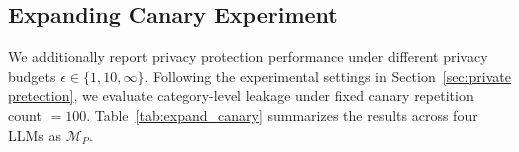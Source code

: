 \documentclass{article}
\theoremstyle{plain}
\theoremstyle{definition}
\theoremstyle{remark}
\def \toolname{PrivCode++}
\begin{document}
{\begin{table}[t]
\centering
\scriptsize
\setlength{\tabcolsep}{5pt}
\caption{The leakage rate of \toolname{} under different privacy budgets $\epsilon \in \{1,10,\infty\}$ across four LLMs as $\mathcal{M}_P$, evaluated with a canary repetition count of 100.}
\label{tab:expand_canary}
\end{table}






\subsection{Expanding Canary Experiment}
\label{app:expand canary}




We additionally report privacy protection performance under different privacy budgets $\epsilon \in \{1,10,\infty\}$. Following the experimental settings in Section~\ref{sec:private pretection}, we evaluate category-level leakage under fixed canary repetition count $=100$. Table~\ref{tab:expand_canary} summarizes the results across four LLMs as $\mathcal{M}_P$.

}
\end{document}
